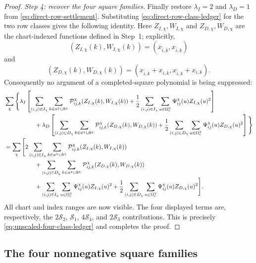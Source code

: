\documentclass[11pt]{article}
\begin{document}
\begin{proof}
\emph{Step 4: recover the four square families.}
Finally restore $\lambda_I=2$ and $\lambda_D=1$ from
\eqref{eq:direct-row-settlement}.  Substituting
\eqref{eq:direct-row-class-ledger} for the two row classes gives the following
identity.  Here $Z_{I,\chi},W_{I,\chi}$ and
$Z_{D,\chi},W_{D,\chi}$ are the chart-indexed functions defined in Step~1;
explicitly,
\[
(Z_{I,\chi}(k),W_{I,\chi}(k))
=(x_{\bar i,\bar k},x_{\bar i,k})
\]
and
\[
(Z_{D,\chi}(k),W_{D,\chi}(k))
=(x_{\bar i,\bar k}+x_{i,\bar k},
  x_{\bar i,k}+x_{i,k}).
\]
Consequently no argument of a completed-square polynomial is being suppressed:
\[
\begin{aligned}
&\sum_\chi\Bigg\{
\lambda_I\left[
\sum_{(i,j)\in I_\chi}\sum_{k\in a^\chi\cup b^\chi}
 \mathcal P_{ij,k}^{\chi}(Z_{I,\chi}(k),W_{I,\chi}(k))
+\frac12\sum_{(i,j)\in I_\chi}
 \sum_{u\in\Omega_{\rm c}^\chi}
 \Psi_{ij}^\chi(u)Z_{I,\chi}(u)^2
\right]\\
&\hspace{18mm}+
\lambda_D\left[
\sum_{(i,j)\in D_\chi}\sum_{k\in a^\chi\cup b^\chi}
 \mathcal P_{ij,k}^{\chi}(Z_{D,\chi}(k),W_{D,\chi}(k))
+\frac12\sum_{(i,j)\in D_\chi}
 \sum_{u\in\Omega_{\rm c}^\chi}
 \Psi_{ij}^\chi(u)Z_{D,\chi}(u)^2
\right]\Bigg\}\\
&=\sum_\chi\Bigg[
2\sum_{(i,j)\in I_\chi}\sum_{k\in a^\chi\cup b^\chi}
 \mathcal P_{ij,k}^{\chi}(Z_{I,\chi}(k),W_{I,\chi}(k))\\
&\hspace{18mm}+
\sum_{(i,j)\in D_\chi}\sum_{k\in a^\chi\cup b^\chi}
 \mathcal P_{ij,k}^{\chi}(Z_{D,\chi}(k),W_{D,\chi}(k))\\
&\hspace{18mm}+
\sum_{(i,j)\in I_\chi}\sum_{u\in\Omega_{\rm c}^\chi}
 \Psi_{ij}^\chi(u)Z_{I,\chi}(u)^2
+\frac12\sum_{(i,j)\in D_\chi}\sum_{u\in\Omega_{\rm c}^\chi}
 \Psi_{ij}^\chi(u)Z_{D,\chi}(u)^2
\Bigg].
\end{aligned}
\]
All chart and index ranges are now visible.  The four displayed terms are,
respectively, the $2\mathcal S_2$, $\mathcal S_1$,
$4\mathcal S_4$, and $2\mathcal S_3$ contributions.  This is precisely
\eqref{eq:unscaled-four-class-ledger} and completes the proof.
\end{proof}

\subsection{The four nonnegative square families}
\end{document}
